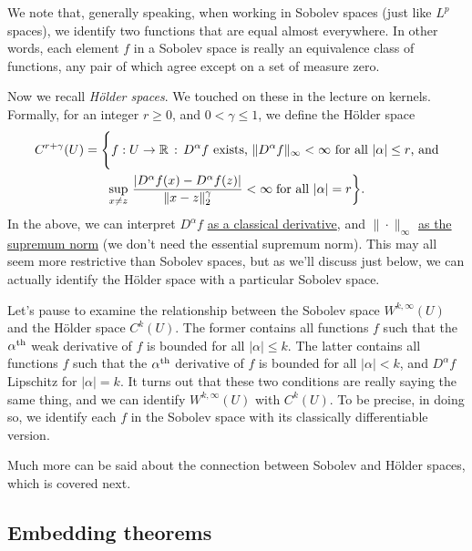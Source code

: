 \documentclass{article}
\begin{document}
We note that, generally speaking, when working in Sobolev spaces (just like
$L^p$ spaces), we identify two functions that are equal almost everywhere. In 
other words, each element $f$ in a Sobolev space is really an equivalence class
of functions, any pair of which agree except on a set of measure zero.

Now we recall \emph{H{\"o}lder spaces}. We touched on these in the lecture on 
kernels. Formally, for an integer $r \geq 0$, and $0 < \gamma \leq 1$, we define
the H{\"o}lder space
\begin{multline*}
C^{r+\gamma}(U) = \Bigg\{ f : U \to \mathbb{R} \,:\, \text{$D^\alpha f$ exists,
  $\|D^\alpha f\|_\infty < \infty$ for all $|\alpha| \leq r$, and} \\   
  \sup_{x \not= z} \, \frac{|D^\alpha f(x) - D^\alpha f(z)|}{\|x-z\|_2^\gamma} < 
  \infty \; \text{for all $|\alpha| = r$} \bigg\}.   
\end{multline*}
In the above, we can interpret $D^\alpha f$ \underline{as a classical
  derivative}, and $\|\cdot\|_\infty$ \underline{as the supremum norm} (we don't
need the essential supremum norm). This may all seem more restrictive than
Sobolev spaces, but as we'll discuss just below, we can actually identify the
H{\"o}lder space with a particular Sobolev space.      

Let's pause to examine the relationship between the Sobolev space
$W^{k,\infty}(U)$ and the H{\"o}lder space $C^k(U)$. The former contains all
functions $f$ such that the $\alpha^{\text{th}}$ weak derivative of $f$ is bounded for
all $|\alpha| \leq k$. The latter contains all functions $f$ such that the
$\alpha^{\text{th}}$ derivative of $f$ is bounded for all $|\alpha| < k$, and $D^\alpha
f$ Lipschitz for $|\alpha| = k$. It turns out that these two conditions are
really saying the same thing, and we can identify $W^{k,\infty}(U)$ with
$C^k(U)$. To be precise,  in doing so, we identify each $f$ in the Sobolev space
with its classically differentiable version.

Much more can be said about the connection between Sobolev and H{\"o}lder
spaces, which is covered next.


\subsection{Embedding theorems}
\end{document}

